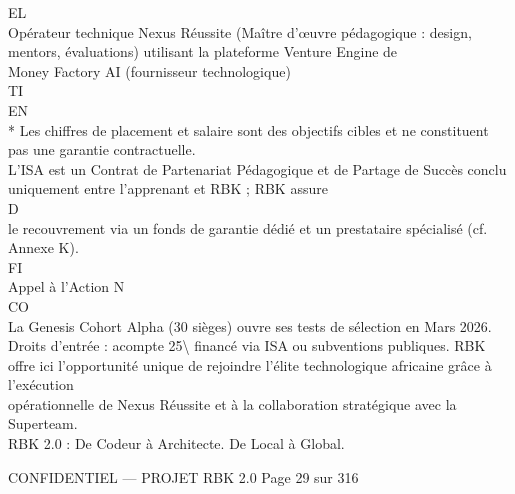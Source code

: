 \documentclass[12pt,landscape,a4paper]{article}
\newenvironment{confidential}
{\begin{tcolorbox}[
    colback=rbkred!5!white,
    colframe=rbkred!75!black,
    title=CONFIDENTIEL,
    fonttitle=\bfseries\color{white},
    coltitle=rbkred!75!black,
    breakable,
    enhanced,
    frame hidden,
    borderline west={2pt}{0pt}{rbkred!75!black}
]}
{\end{tcolorbox}}
\begin{document}
EL\\
Opérateur technique          Nexus Réussite (Maître d’œuvre pédagogique : design, mentors, évaluations) utilisant la plateforme Venture Engine de\\
Money Factory AI (fournisseur technologique)\\
\vspace{0.5em}
\vspace{0.5em}
\vspace{0.5em}
\vspace{0.5em}
TI\\
EN\\
* Les chiffres de placement et salaire sont des objectifs cibles et ne constituent pas une garantie contractuelle.\\
\vspace{0.5em}
L’ISA est un Contrat de Partenariat Pédagogique et de Partage de Succès conclu uniquement entre l’apprenant et RBK ; RBK assure\\
\vspace{0.5em}
\vspace{0.5em}
\vspace{0.5em}
\vspace{0.5em}
D\\
le recouvrement via un fonds de garantie dédié et un prestataire spécialisé (cf. Annexe K).\\
\vspace{0.5em}
\vspace{0.5em}
\vspace{0.5em}
\vspace{0.5em}
FI\\
Appel à l’Action                                                N\\
CO\\
La Genesis Cohort Alpha (30 sièges) ouvre ses tests de sélection en Mars 2026. Droits d’entrée : acompte 25\textbackslash{}%
financé via ISA ou subventions publiques. RBK offre ici l’opportunité unique de rejoindre l’élite technologique africaine grâce à l’exécution\\
opérationnelle de Nexus Réussite et à la collaboration stratégique avec la Superteam.\\
\vspace{0.5em}
\vspace{0.5em}
\vspace{0.5em}
\vspace{0.5em}
RBK 2.0 : De Codeur à Architecte. De Local à Global.\\
\vspace{0.5em}
\vspace{0.5em}
\vspace{0.5em}
\vspace{0.5em}
\begin{confidential}CONFIDENTIEL — PROJET RBK 2.0                                                   Page 29 sur 316\end{confidential}
\end{document}
